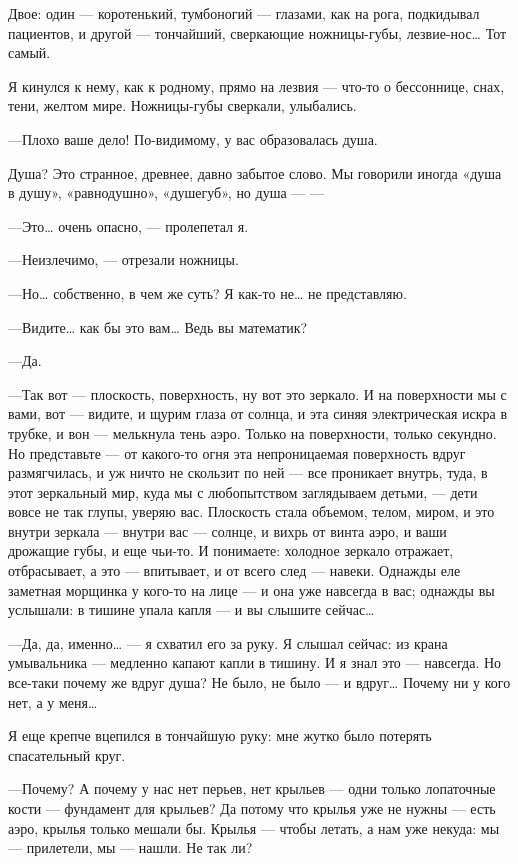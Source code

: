 \documentclass[11pt,openany]{book}
\begin{document}
Двое: один --- коротенький, тумбоногий --- глазами, как на рога, подкидывал пациентов, и другой --- тончайший, сверкающие ножницы-губы, лезвие-нос\ldots{} Тот самый.

Я кинулся к нему, как к родному, прямо на лезвия --- что-то о бессоннице, снах, тени, желтом мире. Ножницы-губы сверкали, улыбались.

---Плохо ваше дело! По-видимому, у вас образовалась душа.

Душа? Это странное, древнее, давно забытое слово. Мы говорили иногда «душа в душу», «равнодушно», «душегуб», но душа --- ---

---Это\ldots{} очень опасно, --- пролепетал я.

---Неизлечимо, --- отрезали ножницы.

---Но\ldots{} собственно, в чем же суть? Я как-то не\ldots{} не представляю.

---Видите\ldots{} как бы это вам\ldots{} Ведь вы математик?

---Да.

---Так вот --- плоскость, поверхность, ну вот это зеркало. И на поверхности мы с вами, вот --- видите, и щурим глаза от солнца, и эта синяя электрическая искра в трубке, и вон --- мелькнула тень аэро. Только на поверхности, только секундно. Но представьте --- от какого-то огня эта непроницаемая поверхность вдруг размягчилась, и уж ничто не скользит по ней --- все проникает внутрь, туда, в этот зеркальный мир, куда мы с любопытством заглядываем детьми, --- дети вовсе не так глупы, уверяю вас. Плоскость стала объемом, телом, миром, и это внутри зеркала --- внутри вас --- солнце, и вихрь от винта аэро, и ваши дрожащие губы, и еще чьи-то. И понимаете: холодное зеркало отражает, отбрасывает, а это --- впитывает, и от всего след --- навеки. Однажды еле заметная морщинка у кого-то на лице --- и она уже навсегда в вас; однажды вы услышали: в тишине упала капля --- и вы слышите сейчас\ldots{}

---Да, да, именно\ldots{} --- я схватил его за руку. Я слышал сейчас: из крана умывальника --- медленно капают капли в тишину. И я знал это --- навсегда. Но все-таки почему же вдруг душа? Не было, не было --- и вдруг\ldots{} Почему ни у кого нет, а у меня\ldots{}

Я еще крепче вцепился в тончайшую руку: мне жутко было потерять спасательный круг.

---Почему? А почему у нас нет перьев, нет крыльев --- одни только лопаточные кости --- фундамент для крыльев? Да потому что крылья уже не нужны --- есть аэро, крылья только мешали бы. Крылья --- чтобы летать, а нам уже некуда: мы --- прилетели, мы --- нашли. Не так ли?
\end{document}
